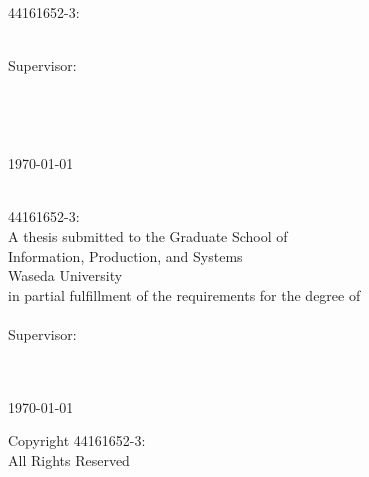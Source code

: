 \documentclass[11pt,
            english,
            oneside,
            liststotoc,
            singlespacing,
            headsepline,
            consistentlayout]{style}
\author{Lester James V. Miranda}
\begin{document}
\frontmatter

\pagestyle{plain}


\begin{titlepage}
\begin{center}
\vspace*{.02\textheight}
{\LARGE \bfseries \ttitle}\vspace{2.5cm} %

{\Large 44161652-3: \authorname} %
\vfill 

{\normalsize \degreename} \\[2.5cm] %

{\normalsize Supervisor: \supname} \\[2.5cm] %

{\normalsize \groupname} \\        %
{\normalsize \facname}   \\        %
{\normalsize \deptname}  \\[0.5cm] %

{\normalsize \univname} \\[0.5cm] %

{\normalsize \today} %
\end{center}
\end{titlepage}

\begin{titlepage}
\begin{center}
\thispagestyle{empty}
\vspace*{.02\textheight}
{\ttitle} \\[2.5cm] %
{44161652-3: \authorname} \\[2.5cm] %
{
    A thesis submitted to the Graduate School of \\
    Information, Production, and Systems\\
    Waseda University\\
    in partial fulfillment of the requirements for the degree of
} \\[1.2cm]

{\degreename} \\[2.5cm]
{Supervisor: \supname} \vfill

{\deptname}\\[1.0cm]
{\univname}\\[1.0cm]
{\today} \vfill

{Copyright  44161652-3: \authorname} \\[0.2cm]
All Rights Reserved
\end{center}
\end{titlepage}
\end{document}
